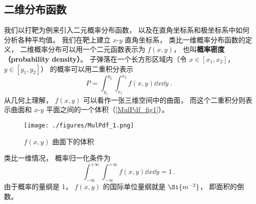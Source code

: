 


\subsection{二维分布函数}
我们以打靶为例来引入二元概率分布函数， 以及在直角坐标系和极坐标系中如何分析各种平均值。 我们在靶上建立 $x$-$y$ 直角坐标系， 类比一维概率分布函数的定义， 二维概率分布可以用一个二元函数表示为 $f(x, y)$， 也叫\textbf{概率密度（probability density）}。 子弹落在一个长方形区域内（令 $x \in [x_1, x_2]$， $y \in [y_1, y_2]$） 的概率可以用二重积分表示
\begin{equation}
P = \int_{y_1}^{y_2} \int_{x_1}^{x_2} f(x, y) \dd{x} \dd{y}~.
\end{equation}
从几何上理解， $f(x, y)$ 可以看作一张三维空间中的曲面， 而这个二重积分则表示曲面和 $x$-$y$ 平面之间的一个体积（\autoref{MulPdf_fig1}）。

\begin{figure}[ht]
\centering
\texttt{[image: ./figures/MulPdf\_1.png]}
\caption{$f(x, y)$ 曲面下的体积} \label{MulPdf_fig1}
\end{figure}

类比一维情况， 概率归一化条件为
\begin{equation}
\int_{-\infty}^{+\infty} \int_{-\infty}^{+\infty} f(x, y) \dd{x} \dd{y} = 1~.
\end{equation}
由于概率的量纲是 1， $f(x, y)$ 的国际单位量纲就是 $\Si{m^{-2}}$， 即面积的倒数。

